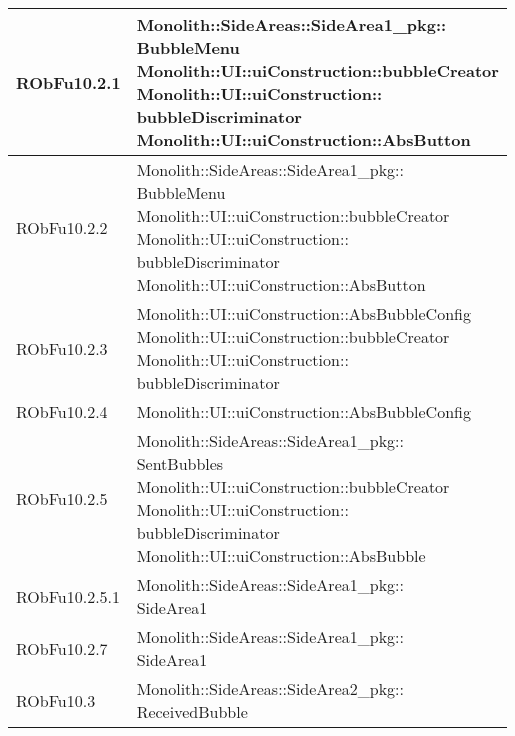 \begin{center}
\begin{longtable}{|
*{1}{>{\centering\arraybackslash}m{2.5cm}|}
*{1}{>{\centering\arraybackslash}m{7.5cm}|}}
RObFu10.2.1 & \makecell[l]{Monolith::SideAreas::SideArea1\_pkg:: \\ \hfill BubbleMenu
\\Monolith::UI::uiConstruction::bubbleCreator
\\Monolith::UI::uiConstruction:: \\ \hfill bubbleDiscriminator
\\Monolith::UI::uiConstruction::AbsButton
\\}\\\hline
RObFu10.2.2 & \makecell[l]{Monolith::SideAreas::SideArea1\_pkg:: \\ \hfill BubbleMenu
\\Monolith::UI::uiConstruction::bubbleCreator
\\Monolith::UI::uiConstruction:: \\ \hfill bubbleDiscriminator
\\Monolith::UI::uiConstruction::AbsButton
\\}\\\hline
RObFu10.2.3 & \makecell[l]{Monolith::UI::uiConstruction::AbsBubbleConfig
\\Monolith::UI::uiConstruction::bubbleCreator
\\Monolith::UI::uiConstruction:: \\ \hfill bubbleDiscriminator
\\}\\\hline
RObFu10.2.4 & \makecell[l]{Monolith::UI::uiConstruction::AbsBubbleConfig
\\}\\\hline
RObFu10.2.5 & \makecell[l]{Monolith::SideAreas::SideArea1\_pkg:: \\ \hfill SentBubbles
\\Monolith::UI::uiConstruction::bubbleCreator
\\Monolith::UI::uiConstruction:: \\ \hfill bubbleDiscriminator
\\Monolith::UI::uiConstruction::AbsBubble
\\}\\\hline
RObFu10.2.5.1 & \makecell[l]{Monolith::SideAreas::SideArea1\_pkg:: \\ \hfill SideArea1
\\}\\\hline
RObFu10.2.7 & \makecell[l]{Monolith::SideAreas::SideArea1\_pkg:: \\ \hfill SideArea1
\\}\\\hline
RObFu10.3 & \makecell[l]{Monolith::SideAreas::SideArea2\_pkg:: \\ \hfill ReceivedBubble
}
\end{longtable}
\end{center}
